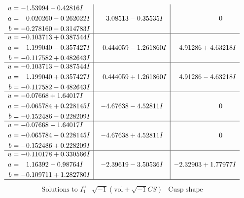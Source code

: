 \documentclass[1p]{elsarticle_modified}
\theoremstyle{definition}
\newcommand{\I}{\sqrt{-1}}
\begin{document}
$$\begin{array}{c|c|c}
\begin{aligned}
u &= -1.53994 - 0.42816 I \\
a &= \phantom{-}0.020260 - 0.262022 I \\
b &= -0.278160 - 0.314783 I\end{aligned}
 & \phantom{-}3.08513 - 0.35535 I & \phantom{-0.000000 } 0 \\ \hline\begin{aligned}
u &= -0.103713 + 0.387544 I \\
a &= \phantom{-}1.199040 - 0.357427 I \\
b &= -0.117582 + 0.482643 I\end{aligned}
 & \phantom{-}0.444059 - 1.261860 I & \phantom{-}4.91286 + 4.63218 I \\ \hline\begin{aligned}
u &= -0.103713 - 0.387544 I \\
a &= \phantom{-}1.199040 + 0.357427 I \\
b &= -0.117582 - 0.482643 I\end{aligned}
 & \phantom{-}0.444059 + 1.261860 I & \phantom{-}4.91286 - 4.63218 I \\ \hline\begin{aligned}
u &= -0.07668 + 1.64017 I \\
a &= -0.065784 + 0.228145 I \\
b &= -0.152486 - 0.228209 I\end{aligned}
 & -4.67638 - 4.52811 I & \phantom{-0.000000 } 0 \\ \hline\begin{aligned}
u &= -0.07668 - 1.64017 I \\
a &= -0.065784 - 0.228145 I \\
b &= -0.152486 + 0.228209 I\end{aligned}
 & -4.67638 + 4.52811 I & \phantom{-0.000000 } 0 \\ \hline\begin{aligned}
u &= -0.110178 + 0.330566 I \\
a &= \phantom{-}1.16392 - 0.98764 I \\
b &= -0.109711 + 1.282780 I\end{aligned}
 & -2.39619 - 3.50536 I & -2.32903 + 1.77977 I\\
 \hline 
 \end{array}$$\newpage$$\begin{array}{c|c|c}  
\text{Solutions to }I^u_{1}& \I (\text{vol} + \sqrt{-1}CS) & \text{Cusp shape}\\
 \hline 
\begin{aligned}

\end{aligned}
\end{array}$$
\end{document}
